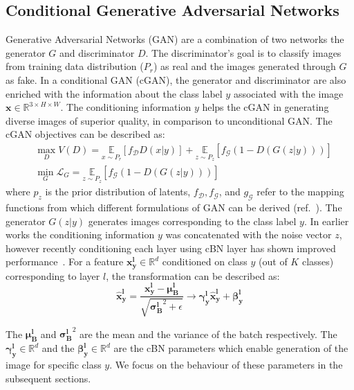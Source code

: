 \documentclass[runningheads,table]{llncs}
\begin{document}
\subsection{Conditional Generative Adversarial Networks}
\label{subsec:GAN}
Generative Adversarial Networks (GAN) are a combination of two networks the generator $G$ and discriminator $D$. The discriminator's goal is to classify images from training data distribution ($P_{r}$) as real and the images generated through $G$ as fake. In a conditional GAN (cGAN), the generator and discriminator are also enriched with the information about the class label $y$ associated with the image $\mathbf{x} \in \mathbb{R}^{3\times H \times W}$. The conditioning information $y$ helps the cGAN in generating diverse images of superior quality, in comparison to unconditional GAN. The cGAN objectives can be described as:
\begin{equation}
\begin{split}
      &\max_D V(D) = \underset{x \sim P_{r}}{\mathbb{E}}[f_\mathcal{D} D(x|y)] + \underset{z \sim P_{z}}{\mathbb{E}}[f_{\mathcal{G}}(1 - D(G(z|y)))] \\
     & \min_G \mathcal{L}_{G} = \underset{z \sim P_{z}}{\mathbb{E}}[f_{\mathcal{G}}(1 - D(G(z|y)))] 
\end{split}
\end{equation}
where $p_z$ is the prior distribution of latents, $f_{\mathcal{D}}, f_{\mathcal{G}}$, and $g_\mathcal{{G}}$ refer to the mapping functions from which different formulations of GAN can be derived (ref.~\cite{liu2021generative}). The generator $G(z|y)$ generates images corresponding to the class label $y$. In earlier works the conditioning information $y$ was concatenated with the noise vector $z$, however recently conditioning each layer using cBN layer has shown improved performance~\cite{miyato2018cgans}. For a feature $\mathbf{x^l_y} \in \mathbb{R}^d$ conditioned on class $y$ (out of $K$ classes) corresponding to layer $l$, the transformation can be described as:
\begin{equation}
    \mathbf{\hat{x}_{y}^{l}} = \frac{\mathbf{{x}_{y}^{l}} - \mathbf{\mu_B^{l}}}{\sqrt{{\mathbf{\sigma^{l}_B}}^2  + \epsilon}} \rightarrow \mathbf{\gamma^l_{y}} \mathbf{\hat{x}_{y}^{l}} + \mathbf{\beta^l_{y}}
\end{equation}


The $\mathbf{\mu_B^{l}}$ and ${\mathbf{\sigma^{l}_B}}^2$ are the mean and the variance of the batch respectively. The $\mathbf{\gamma^l_{y}} \in \mathbb{R}^d$ and the $\mathbf{\beta^l_{y}} \in \mathbb{R}^d$ are the cBN parameters which enable generation of the image for specific class $y$. We focus on the behaviour of these parameters in the subsequent sections. 
\end{document}
